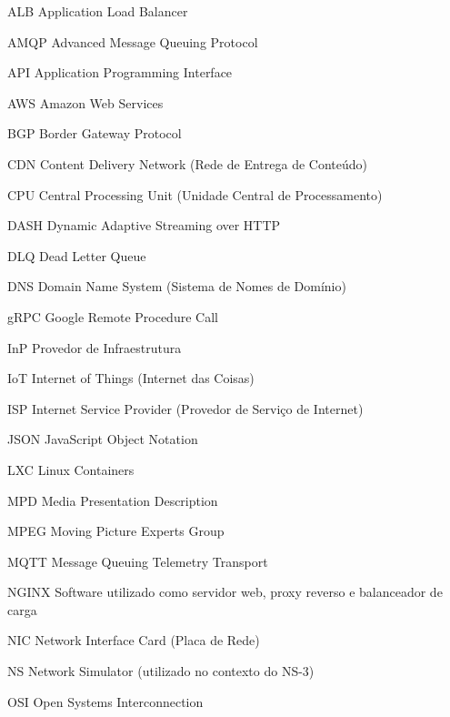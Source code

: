 
\listoffigures*
\cleardoublepage




\begin{siglas}
\item[ALB] Application Load Balancer 
\item[AMQP] Advanced Message Queuing Protocol 
\item[API] Application Programming Interface 
\item[AWS] Amazon Web Services 
\item[BGP] Border Gateway Protocol 
\item[CDN] Content Delivery Network (Rede de Entrega de Conteúdo) 
\item[CPU] Central Processing Unit (Unidade Central de Processamento) 
\item[DASH] Dynamic Adaptive Streaming over HTTP 
\item[DLQ] Dead Letter Queue 
\item[DNS] Domain Name System (Sistema de Nomes de Domínio) 
\item[gRPC] Google Remote Procedure Call 
\item[InP] Provedor de Infraestrutura 
\item[IoT] Internet of Things (Internet das Coisas) 
\item[ISP] Internet Service Provider (Provedor de Serviço de Internet) 
\item[JSON] JavaScript Object Notation 
\item[LXC] Linux Containers 
\item[MPD] Media Presentation Description 
\item[MPEG] Moving Picture Experts Group 
\item[MQTT] Message Queuing Telemetry Transport 
\item[NGINX] Software utilizado como servidor web, proxy reverso e balanceador de carga 
\item[NIC] Network Interface Card (Placa de Rede) 
\item[NS] Network Simulator (utilizado no contexto do NS-3) 
\item[OSI] Open Systems Interconnection 

\end{siglas}
